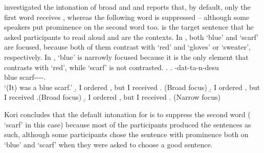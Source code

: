 %
\largerpage
{} investigated the intonation of broad and  and
reports that, by default,
only the first word receives , whereas the following word is
suppressed -- 
although some speakers put prominence on the second word too.
\Next[a] is the target sentence that he asked participants to read aloud
and \Next[b-c] are the contexts.
In \Next[b-c], both  `blue' and  `scarf' are focused, because both of them contrast with `red' and `gloves' or `sweater', respectively.
In \Next[d],  `blue' is narrowly focused
because it is the only element that contrasts with `red', while `scarf' is not contrasted.
%
\ex.
 \ag.  -dat-ta-n-desu \\
      blue scarf----. \\
      `(It) was a blue scarf.'
 \b. I ordered , but I received . \hfill{(Broad focus)}
 \b. I ordered , but I received .\hfill{(Broad focus)}
 \b. I ordered , but I received . \hfill{(Narrow focus)}

Kori concludes that
the default intonation for  is to suppress the second word ( `scarf' in this case)
because most of the participants produced the sentences as such,
although some participants chose the sentence with prominence both on  `blue' and  `scarf'
when they were asked to choose a good sentence.

